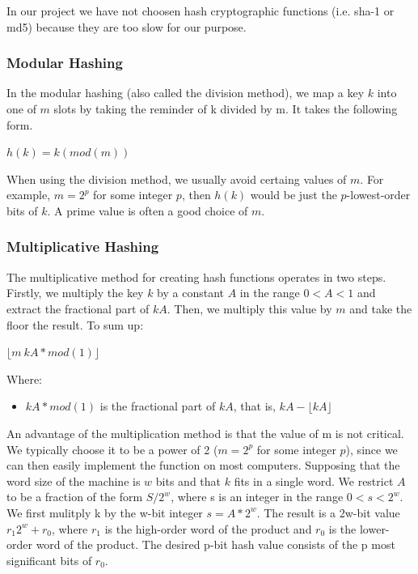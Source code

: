 \documentclass[12pt]{article}
\begin{document}
In our project we have not choosen hash cryptographic functions (i.e. sha-1 or md5) because they are too slow for our purpose.

\subsubsection{Modular Hashing}

In the modular hashing (also called the division method), we map a key $k$ into one of $m$ slots by taking the reminder of k divided by m. It takes the following form. 

\begin{center} $h(k) = k (mod (m))$ \end{center}

When using the division method, we usually avoid certaing values of $m$. For example, $m = 2^p$ for some integer $p$, then $h(k)$ would be just the $p$-lowest-order bits of $k$. A prime value is often a good choice of $m$.



\subsubsection{Multiplicative Hashing}
The multiplicative method for creating hash functions operates in two steps.
Firstly, we multiply the key $k$ by a constant $A$ in the range $0<A<1$ and extract the fractional part of $kA$. Then, we multiply this value by $m$ and take the floor the result. To sum up:  

\begin{center}
 $ \lfloor m\ kA*mod(1)  \rfloor$
\end{center}
Where:
\begin{itemize}
\item $kA*mod(1)$  is the fractional part of $kA$, that is, $kA- \lfloor kA \rfloor$
\end{itemize}
An advantage of the multiplication method is that the value of m is not critical. We typically choose it to be a power of 2 ($m = 2^p$ for some integer $p$), since we can then easily implement the function on most computers. 
Supposing that the word size of the machine is $w$ bits and that $k$ fits in a single word. We restrict $A$ to be a fraction of the form $S/2^w$, where s is an integer in the range $0<s<2^w$. We first mulitply k by the w-bit integer $s = A*2^w$. The result is a 2w-bit value $r_1 2^w + r_0$, where $r_1$ is the high-order word of the product and $r_0$ is the lower-order word of the product. The desired p-bit hash value consists of the p most significant bits of $r_0$. 
\end{document}
